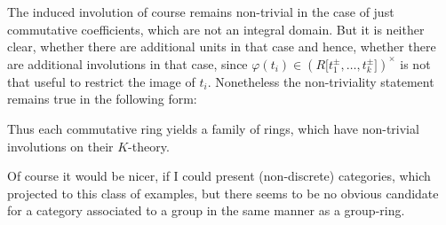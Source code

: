 The induced involution of course remains non-trivial in the case of just commutative coefficients, which are not an integral domain. But it is neither clear, whether there are additional units in that case and hence, whether there are additional
involutions in that case, since $\varphi(t_i)\in (R\lbrack t_1^\pm,\ldots,t_k^\pm\rbrack)^\times$ is not that useful to restrict the image of $t_i$. Nonetheless the non-triviality statement remains true in the following form:

Thus each commutative ring yields a family of rings, which have non-trivial involutions on their $K$-theory.

Of course it would be nicer, if I could present (non-discrete) categories, which projected to this class of
examples, but there seems to be no obvious candidate for a category associated to a group in the same manner as a group-ring.